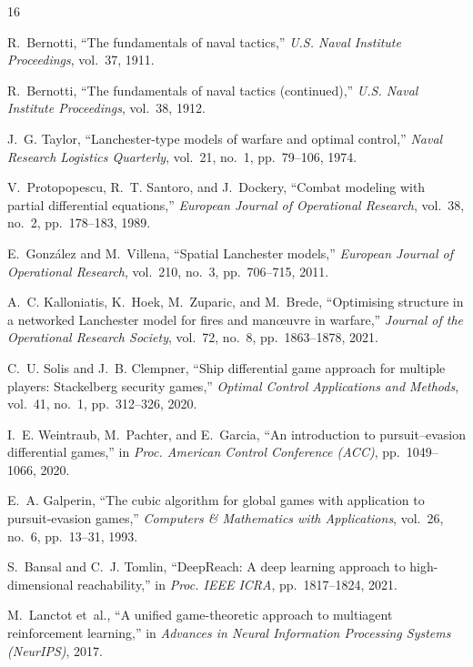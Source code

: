 \documentclass[12pt,a4paper]{article}
\begin{document}

\begin{thebibliography}{16}

R.~Bernotti, ``The fundamentals of naval tactics,'' \emph{U.S. Naval
Institute Proceedings}, vol.~37, 1911.

R.~Bernotti, ``The fundamentals of naval tactics (continued),'' \emph{U.S.
Naval Institute Proceedings}, vol.~38, 1912.

J.~G. Taylor, ``Lanchester-type models of warfare and optimal control,''
\emph{Naval Research Logistics Quarterly}, vol.~21, no.~1, pp.~79--106,
1974.

V.~Protopopescu, R.~T. Santoro, and J.~Dockery, ``Combat modeling with
partial differential equations,'' \emph{European Journal of Operational
Research}, vol.~38, no.~2, pp.~178--183, 1989.

E.~Gonz{\'a}lez and M.~Villena, ``Spatial Lanchester models,'' \emph{European
Journal of Operational Research}, vol.~210, no.~3, pp.~706--715, 2011.

A.~C. Kalloniatis, K.~Hoek, M.~Zuparic, and M.~Brede, ``Optimising
structure in a networked Lanchester model for fires and man{\oe}uvre in
warfare,'' \emph{Journal of the Operational Research Society}, vol.~72,
no.~8, pp.~1863--1878, 2021.

C.~U. Solis and J.~B. Clempner, ``Ship differential game approach for
multiple players: Stackelberg security games,'' \emph{Optimal Control
Applications and Methods}, vol.~41, no.~1, pp.~312--326, 2020.

I.~E. Weintraub, M.~Pachter, and E.~Garcia, ``An introduction to
pursuit--evasion differential games,'' in \emph{Proc. American Control
Conference (ACC)}, pp.~1049--1066, 2020.

E.~A. Galperin, ``The cubic algorithm for global games with application to
pursuit-evasion games,'' \emph{Computers \& Mathematics with Applications},
vol.~26, no.~6, pp.~13--31, 1993.

S.~Bansal and C.~J. Tomlin, ``DeepReach: A deep learning approach to
high-dimensional reachability,'' in \emph{Proc. IEEE ICRA}, pp.~1817--1824,
2021.

M.~Lanctot et~al., ``A unified game-theoretic approach to multiagent
reinforcement learning,'' in \emph{Advances in Neural Information
Processing Systems (NeurIPS)}, 2017.


\end{thebibliography}
\end{document}
